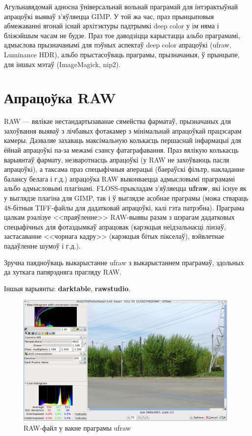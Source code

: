 \documentclass[10pt, a5paper]{article}
\begin{document}
Агульнавядомай адносна ўніверсальнай вольнай праграмай для інтэрактыўнай апрацоўкі выяваў з'яўляецца GIMP. У той жа час, праз прынцыповыя абмежаванні ягонай існай архітэктуры падтрымкі deep color у ім няма і бліжэйшым часам не будзе. Праз тое даводзіцца карыстацца альбо праграмамі, адмыслова прызначанымі для пэўных аспектаў deep color апрацоўкі (ufraw, Luminance HDR), альбо прыстасоўваць праграмы, прызначаныя, ў прынцыпе, для іншых мэтаў (ImageMagick, nip2).

\section*{Апрацоўка RAW}

RAW --- вялікае нестандартызаванае сямейства фарматаў, прызначаных для захоўвання выяваў з лічбавых фотакамер з мінімальнай апрацоўкай працэсарам камеры. Дазваляе захаваць максімальную колькасць першаснай інфармацыі для ёйнай апрацоўкі па-за межамі сэансу фатаграфавання. Праз вялікую колькасць варыянтаў фармату, незваротнасць апрацоўкі (у RAW не захоўваюць пасля апрацоўкі), а таксама праз спецыфічныя аперацыі (баераўскі фільтр, накладанне балансу белага і г.д.) апрацоўка RAW выконваецца адмысловымі праграмамі альбо адмысловымі плагінамі. FLOSS-прыкладам з'яўляецца \textbf{ufraw}, які існуе як у выглядзе плагіна для GIMP, так і ў выглядзе асобнае праграмы (можа ствараць 48-бітныя TIFF-файлы для дадатковай апрацоўкі, калі гэта патрэбна). Праграма цалкам рэалізуе <<праяўленне>> RAW-выявы разам з шэрагам дадатковых спецыфічных для фотаздымкаў апрацовак (карэкцыя неідэальнасці лінзаў, застасаванне <<чорнага кадру>> (карэкцыя бітых пікселаў), вэйвлетнае падаўленне шумоў і г.д.).

Зручна паядноўваць выкарыстанне ufraw з выкарыстаннем праграмаў, здольных да хуткага папярэдняга прагляду RAW.

Іншыя варыянты: \textbf{darktable}, \textbf{rawstudio}.

\begin{figure}[htpb]
 \includegraphics[width=110mm]{LAS_LVEE_2012_RAW.jpg}
 \caption{RAW-файл у вакне праграмы ufraw}
 \label{fig:RAW}
\end{figure}
\end{document}
